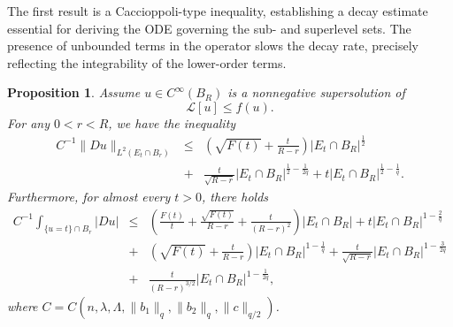 \documentclass[12pt,a4paper]{amsart}
\numberwithin{equation}{section} %
\newtheorem{proposition}[theorem]{Proposition}
\theoremstyle{definition}
\theoremstyle{remark}
\begin{document}
The first result is a Caccioppoli-type inequality, establishing a decay estimate essential for deriving the ODE governing the sub- and superlevel sets. The presence of unbounded terms in the operator slows the decay rate, precisely reflecting the integrability of the lower-order terms.

\begin{proposition}\label{cacciopoli inequality}
Assume $u \in C^\infty(B_R)$ is a nonnegative supersolution of
$$
    \mathcal{L}[u] \leq f(u).
$$
For any $0 < r < R$, we have the inequality
\begin{eqnarray}
    C^{-1}\|Du\|_{L^2(E_t \cap B_r)} & \leq & \left(\sqrt{F(t)} + \frac{t}{R-r} \right)|E_t \cap B_R|^{\frac{1}{2}}  \label{estimate in L^2} \\ 
    & + &  \frac{t}{\sqrt{R-r}}|E_t \cap B_R|^{\frac{1}{2}-\frac{1}{2q}}+  t|E_t \cap B_R|^{\frac{1}{2}-\frac{1}{q}}. \nonumber
\end{eqnarray}
Furthermore, for almost every $t>0$, there  holds
\begin{eqnarray*}
    C^{-1}\int_{\{u=t \} \cap B_r} |Du|  &\leq & \left(\frac{F(t)}{t}+\frac{\sqrt{F(t)}}{R-r} +\frac{t}{(R-r)^2} \right)|E_t \cap B_R| + t|E_t \cap B_R|^{1-\frac{2}{q}}\\
    & + & \left(\sqrt{F(t)} +\frac{t}{R-r} \right)|E_t \cap B_R|^{1 - \frac{1}{q}} + \frac{t}{\sqrt{R-r}}|E_t \cap B_R|^{1 - \frac{3}{2q}}\\
    & + & \frac{t}{(R-r)^{3/2}}|E_t \cap B_R|^{1-\frac{1}{2q}},
\end{eqnarray*}
where $C = C(n,\lambda,\Lambda,\|b_1\|_{q},\|b_2\|_{q},\|c\|_{q/2})$.
\end{proposition}
\end{document}
